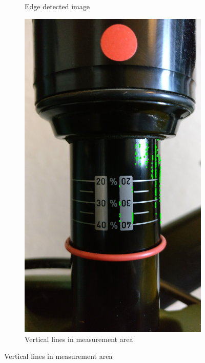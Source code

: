 \begin{figure}[h!]
\begin{subfigure}[t]{0.4\textwidth}
				\caption{Edge detected image}
				\label{subfig:edge_detect}
			\end{subfigure}
			\begin{subfigure}[t]{0.4\textwidth}
				\centering
				\includegraphics[scale=0.085,
								trim={40cm 35cm 10cm 50cm},
								clip]{../images/results/raw_lines.jpg}
				\caption{Vertical lines in measurement area}
				\label{subfig:lines}
			\end{subfigure}
		\end{figure}

